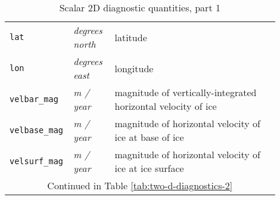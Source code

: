 \begin{table}[ht]
\begin{tabular}{p{0.15\linewidth}p{0.15\linewidth}p{0.6\linewidth}}
    \texttt{lat} & \textsl{degrees north} & latitude \\
    \texttt{lon} & \textsl{degrees east} & longitude \\
    \texttt{velbar_mag} & \textsl{m / year} &  magnitude of vertically-integrated horizontal velocity of ice \\
    \texttt{velbase_mag} & \textsl{m / year} &  magnitude of horizontal velocity of ice at base of ice \\
    \texttt{velsurf_mag} & \textsl{m / year} &  magnitude of horizontal velocity of ice at ice surface \\
   \multicolumn{3}{c}{Continued in Table \ref{tab:two-d-diagnostics-2}}\\
  \bottomrule
  \end{tabular}
  \caption{Scalar 2D diagnostic quantities, part 1}
  \label{tab:two-d-diagnostics-1}
\end{table}

